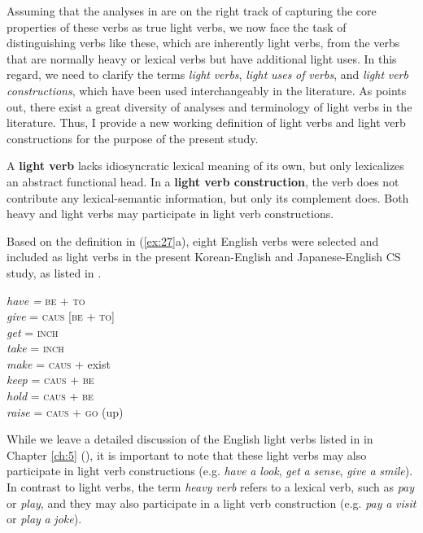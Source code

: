 Assuming that the analyses in  are on the right track of capturing the core properties of these verbs as true light verbs, we now face the task of distinguishing verbs like these, which are inherently light verbs, from the verbs that are normally heavy or lexical verbs but have additional light uses. In this regard, we need to clarify the terms \textit{light} \textit{verbs}, \textit{light} \textit{uses} \textit{of} \textit{verbs}, and \textit{light} \textit{verb} \textit{constructions}, which have been used interchangeably in the literature. As \citet{Butt2003} points out, there exist a great diversity of analyses and terminology of light verbs in the literature. Thus, I provide a new working definition of light verbs and light verb constructions for the purpose of the present study.

\begin{exe}\ex \label{ex:27}
\begin{xlist}
    \ex A \textbf{light verb} lacks idiosyncratic lexical meaning of its own, but only lexicalizes an abstract functional head. 
    \ex 	In a \textbf{light verb construction}, the verb does not contribute any lexical-semantic information, but only its complement does. Both heavy and light verbs may participate in light verb constructions. 
\end{xlist}
\end{exe}

Based on the definition in (\ref{ex:27}a), eight English verbs were selected and included as light verbs in the present Korean-English and Japanese-English \ac{CS} study, as listed in .

\begin{exe}\ex\label{ex:28}
\textit{have} \textit{=} \textsc{be} \textsc{+} \textsc{to}  \\
\textit{give} = \textsc{caus} \textsc{[be} \textsc{+} \textsc{to]}  \\   
  \textit{get} = \textsc{inch}           \\
  \textit{take} = \textsc{inch} \\
  \textit{make} = \textsc{caus} + exist \\        
  \textit{keep} = \textsc{caus} \textsc{+} \textsc{be} \\
\textit{hold} = \textsc{caus} \textsc{+} \textsc{be} \\
\textit{raise} = \textsc{caus} \textsc{+} \textsc{go} (up)
\end{exe}

While we leave a detailed discussion of the English light verbs listed in  in Chapter \ref{ch:5} (), it is important to note that these light verbs may also participate in light verb constructions (e.g. \textit{have} \textit{a} \textit{look}, \textit{get} \textit{a} \textit{sense}, \textit{give} \textit{a} \textit{smile}). In contrast to light verbs, the term \textit{heavy} \textit{verb} refers to a lexical verb, such as \textit{pay} or \textit{play}, and they may also participate in a light verb construction (e.g. \textit{pay} \textit{a} \textit{visit} or \textit{play} \textit{a} \textit{joke}). 

